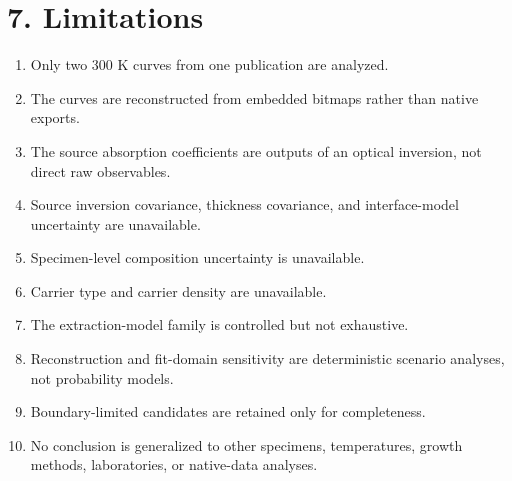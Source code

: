 \section{7. Limitations}\label{limitations}

\begin{enumerate}
\def\labelenumi{\arabic{enumi}.}
\tightlist
\item
  Only two 300 K curves from one publication are analyzed.
\item
  The curves are reconstructed from embedded bitmaps rather than native
  exports.
\item
  The source absorption coefficients are outputs of an optical
  inversion, not direct raw observables.
\item
  Source inversion covariance, thickness covariance, and interface-model
  uncertainty are unavailable.
\item
  Specimen-level composition uncertainty is unavailable.
\item
  Carrier type and carrier density are unavailable.
\item
  The extraction-model family is controlled but not exhaustive.
\item
  Reconstruction and fit-domain sensitivity are deterministic scenario
  analyses, not probability models.
\item
  Boundary-limited candidates are retained only for completeness.
\item
  No conclusion is generalized to other specimens, temperatures, growth
  methods, laboratories, or native-data analyses.
\end{enumerate}
